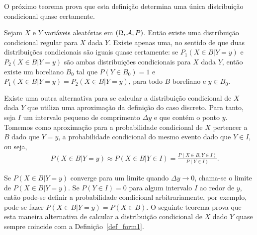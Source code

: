 \begin{frame}
O próximo teorema prova que esta definição determina uma única distribuição condicional quase certamente.

\begin{teo}
Sejam $X$ e $Y$ variáveis aleatórias em $(\Omega,{\cal A},P)$. Então
existe uma distribuição condicional regular para $X$ dada $Y$.
Existe apenas uma, no sentido de que duas distribuições condicionais
são iguais quase certamente: se $P_1(X\in B|Y=y)$ e $P_2(X\in
B|Y=y)$ são ambas distribuições condicionais para $X$ dada $Y$,
então existe um boreliano $B_0$ tal que $P(Y\in B_0)=1$ e $P_1(X\in
B|Y=y)=P_2(X\in B|Y=y)$, para todo $B$ boreliano e $y\in B_0$.
\end{teo}


Existe uma outra alternativa para se calcular a distribuição
condicional de $X$ dada $Y$ que utiliza uma aproximação da definição do caso
discreto. Para tanto, seja $I$ um intervalo pequeno de comprimento
$\Delta y$ e que contém o ponto $y$. Tomemos como aproximação para a
probabilidade condicional de $X$ pertencer a $B$ dado que $Y=y$, a
probabilidade condicional do mesmo evento dado que $Y\in I$, ou
seja,
\begin{eqnarray}
& & P(X\in B|Y=y)\approx P(X\in B|Y\in I)=\frac{P(X\in B,Y\in I)}{P(Y\in I)}.\nonumber
\end{eqnarray}

Se $P(X\in B|Y=y)$ converge para um limite quando $\Delta y\rightarrow 0$, chama-se o limite de $P(X\in B|Y=y)$. Se $P(Y\in I)=0$ para algum intervalo $I$ ao redor de $y$, então pode-se definir a probabilidade condicional arbitrariamente, por exemplo, pode-se fazer $P(X\in B|Y=y)=P(X\in B)$. O seguinte teorema prova que esta maneira alternativa de calcular a distribuição condicional
de $X$ dado $Y$ quase sempre coincide com a Definição~\ref{def_form1}.
\end{frame}

